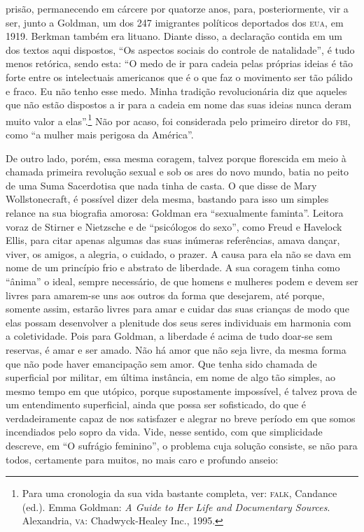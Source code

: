 prisão, permanecendo em cárcere por quatorze anos, para, posteriormente,
vir a ser, junto a Goldman, um dos 247 imigrantes políticos deportados
dos \textsc{eua}, em 1919. Berkman também era lituano. Diante disso, a declaração
contida em um dos textos aqui dispostos, ``Os aspectos sociais do
controle de natalidade'', é tudo menos retórica, sendo esta: ``O medo de
ir para cadeia pelas próprias ideias é tão forte entre os intelectuais
americanos que é o que faz o movimento ser tão pálido e fraco. Eu não
tenho esse medo. Minha tradição revolucionária diz que aqueles que não
estão dispostos a ir para a cadeia em nome das suas ideias nunca deram
muito valor a elas''.\footnote{Para uma cronologia da sua vida bastante
  completa, ver: \textsc{falk}, Candance (ed.). Emma Goldman: \emph{A Guide to
  Her Life and Documentary Sources}. Alexandria, \textsc{va}: Chadwyck-Healey
  Inc., 1995.} Não por acaso, foi considerada pelo primeiro diretor do
\textsc{fbi}, como ``a mulher mais perigosa da América''.

De outro lado, porém, essa mesma coragem, talvez porque florescida em
meio à chamada primeira revolução sexual e sob os ares do novo mundo,
batia no peito de uma Suma Sacerdotisa que nada tinha de casta. O que
disse de Mary Wollstonecraft, é possível dizer dela mesma, bastando para
isso um simples relance na sua biografia amorosa: Goldman era
``sexualmente faminta''. Leitora voraz de Stirner e Nietzsche e de
``psicólogos do sexo'', como Freud e Havelock Ellis, para citar apenas
algumas das suas inúmeras referências, amava dançar, viver, os amigos, a
alegria, o cuidado, o prazer. A causa para ela não se dava em nome de um
princípio frio e abstrato de liberdade. A sua coragem tinha como
``ânima'' o ideal, sempre necessário, de que homens e mulheres podem e
devem ser livres para amarem-se uns aos outros da forma que desejarem,
até porque, somente assim, estarão livres para amar e cuidar das suas
crianças de modo que elas possam desenvolver a plenitude dos seus seres
individuais em harmonia com a coletividade. Pois para Goldman, a
liberdade é acima de tudo doar-se sem reservas, é amar e ser amado. Não
há amor que não seja livre, da mesma forma que não pode haver
emancipação sem amor. Que tenha sido chamada de superficial por militar,
em última instância, em nome de algo tão simples, ao mesmo tempo em que
utópico, porque supostamente impossível, é talvez prova de um
entendimento superficial, ainda que possa ser sofisticado, do que é
verdadeiramente capaz de nos satisfazer e alegrar no breve período em
que somos incendiados pelo sopro da vida. Vide, nesse sentido, com que
simplicidade descreve, em ``O sufrágio feminino'', o problema cuja
solução consiste, se não para todos, certamente para muitos, no mais
caro e profundo anseio:


